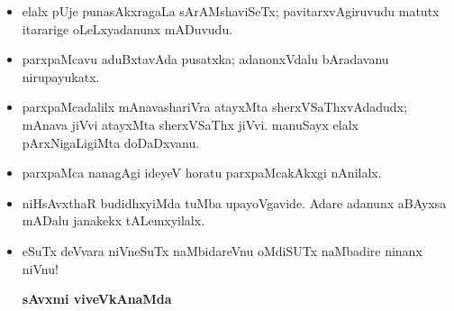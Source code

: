 \bigskip

\begin{itemize}
\item elalx pUje punasAkxragaLa sArAMshaviSeTx; pavitarxvAgiruvudu matutx itararige oLeLxyadanunx mADuvudu.

\item parxpaMcavu aduBxtavAda pusatxka; adanonxVdalu bAradavanu nirupayukatx.

\item parxpaMcadalilx mAnavashariVra atayxMta sherxVSaThxvAdadudx; mAnava jiVvi atayxMta sherxVSaThx jiVvi. manuSayx elalx pArxNigaLigiMta doDaDxvanu.

\item parxpaMca nanagAgi ideyeV horatu parxpaMcakAkxgi nAnilalx.

\item niHsAvxthaR budidhxyiMda tuMba upayoVgavide. Adare adanunx aBAyxsa mADalu janakekx tALemxyilalx.

\item eSuTx deVvara niVneSuTx naMbidareVnu oMdiSUTx naMbadire ninanx niVnu!

\begin{flushright}
{\textbf {sAvxmi viveVkAnaMda}}
\end{flushright}
\end{itemize}
